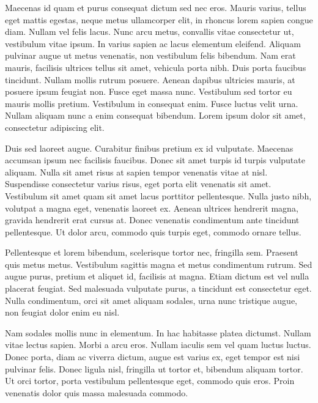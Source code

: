 \documentclass[timesfont,runinheadings]{nsfgrfp}
\begin{document}
Maecenas id quam et purus consequat dictum sed nec eros. Mauris varius,
tellus eget mattis egestas, neque metus ullamcorper elit, in rhoncus
lorem sapien congue diam. Nullam vel felis lacus. Nunc arcu metus,
convallis vitae consectetur ut, vestibulum vitae ipsum. In varius sapien
ac lacus elementum eleifend. Aliquam pulvinar augue ut metus venenatis,
non vestibulum felis bibendum. Nam erat mauris, facilisis ultrices
tellus sit amet, vehicula porta nibh. Duis porta faucibus tincidunt.
Nullam mollis rutrum posuere. Aenean dapibus ultricies mauris, at
posuere ipsum feugiat non. Fusce eget massa nunc. Vestibulum sed tortor
eu mauris mollis pretium. Vestibulum in consequat enim. Fusce luctus
velit urna. Nullam aliquam nunc a enim consequat bibendum. Lorem ipsum
dolor sit amet, consectetur adipiscing elit.

Duis sed laoreet augue. Curabitur finibus pretium ex id vulputate.
Maecenas accumsan ipsum nec facilisis faucibus. Donec sit amet turpis id
turpis vulputate aliquam. Nulla sit amet risus at sapien tempor
venenatis vitae at nisl. Suspendisse consectetur varius risus, eget
porta elit venenatis sit amet. Vestibulum sit amet quam sit amet lacus
porttitor pellentesque. Nulla justo nibh, volutpat a magna eget,
venenatis laoreet ex. Aenean ultrices hendrerit magna, gravida hendrerit
erat cursus at. Donec venenatis condimentum ante tincidunt pellentesque.
Ut dolor arcu, commodo quis turpis eget, commodo ornare tellus.

Pellentesque et lorem bibendum, scelerisque tortor nec, fringilla sem.
Praesent quis metus metus. Vestibulum sagittis magna et metus
condimentum rutrum. Sed augue purus, pretium et aliquet id, facilisis at
magna. Etiam dictum est vel nulla placerat feugiat. Sed malesuada
vulputate purus, a tincidunt est consectetur eget. Nulla condimentum,
orci sit amet aliquam sodales, urna nunc tristique augue, non feugiat
dolor enim eu nisl.

Nam sodales mollis nunc in elementum. In hac habitasse platea dictumst.
Nullam vitae lectus sapien. Morbi a arcu eros. Nullam iaculis sem vel
quam luctus luctus. Donec porta, diam ac viverra dictum, augue est
varius ex, eget tempor est nisi pulvinar felis. Donec ligula nisl,
fringilla ut tortor et, bibendum aliquam tortor. Ut orci tortor, porta
vestibulum pellentesque eget, commodo quis eros. Proin venenatis dolor
quis massa malesuada commodo.
\end{document}
